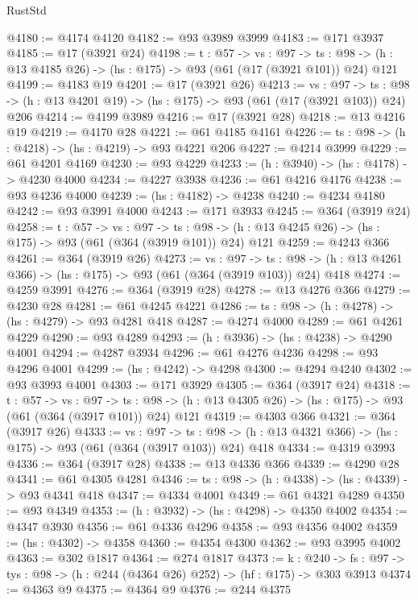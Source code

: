 \begin{lexlean}{RustStd}
\begin{coremodule}
@4180 := @4174 @4120
@4182 := @93 @3989 @3999
@4183 := @171 @3937
@4185 := @17 (@3921 @24)
@4198 := {t : @57} ->
  {vs : @97} ->
  {ts : @98} -> (h : @13 @4185 @26) -> (hs : @175) -> @93 (@61 (@17 (@3921 @101)) @24) @121
@4199 := @4183 @19
@4201 := @17 (@3921 @26)
@4213 := {vs : @97} ->
  {ts : @98} -> (h : @13 @4201 @19) -> (hs : @175) -> @93 (@61 (@17 (@3921 @103)) @24) @206
@4214 := @4199 @3989
@4216 := @17 (@3921 @28)
@4218 := @13 @4216 @19
@4219 := @4170 @28
@4221 := @61 @4185 @4161
@4226 := {ts : @98} -> (h : @4218) -> (hs : @4219) -> @93 @4221 @206
@4227 := @4214 @3999
@4229 := @61 @4201 @4169
@4230 := @93 @4229
@4233 := (h : @3940) -> (hs : @4178) -> @4230 @4000
@4234 := @4227 @3938
@4236 := @61 @4216 @4176
@4238 := @93 @4236 @4000
@4239 := (hs : @4182) -> @4238
@4240 := @4234 @4180
@4242 := @93 @3991 @4000
@4243 := @171 @3933
@4245 := @364 (@3919 @24)
@4258 := {t : @57} ->
  {vs : @97} ->
  {ts : @98} -> (h : @13 @4245 @26) -> (hs : @175) -> @93 (@61 (@364 (@3919 @101)) @24) @121
@4259 := @4243 @366
@4261 := @364 (@3919 @26)
@4273 := {vs : @97} ->
  {ts : @98} -> (h : @13 @4261 @366) -> (hs : @175) -> @93 (@61 (@364 (@3919 @103)) @24) @418
@4274 := @4259 @3991
@4276 := @364 (@3919 @28)
@4278 := @13 @4276 @366
@4279 := @4230 @28
@4281 := @61 @4245 @4221
@4286 := {ts : @98} -> (h : @4278) -> (hs : @4279) -> @93 @4281 @418
@4287 := @4274 @4000
@4289 := @61 @4261 @4229
@4290 := @93 @4289
@4293 := (h : @3936) -> (hs : @4238) -> @4290 @4001
@4294 := @4287 @3934
@4296 := @61 @4276 @4236
@4298 := @93 @4296 @4001
@4299 := (hs : @4242) -> @4298
@4300 := @4294 @4240
@4302 := @93 @3993 @4001
@4303 := @171 @3929
@4305 := @364 (@3917 @24)
@4318 := {t : @57} ->
  {vs : @97} ->
  {ts : @98} -> (h : @13 @4305 @26) -> (hs : @175) -> @93 (@61 (@364 (@3917 @101)) @24) @121
@4319 := @4303 @366
@4321 := @364 (@3917 @26)
@4333 := {vs : @97} ->
  {ts : @98} -> (h : @13 @4321 @366) -> (hs : @175) -> @93 (@61 (@364 (@3917 @103)) @24) @418
@4334 := @4319 @3993
@4336 := @364 (@3917 @28)
@4338 := @13 @4336 @366
@4339 := @4290 @28
@4341 := @61 @4305 @4281
@4346 := {ts : @98} -> (h : @4338) -> (hs : @4339) -> @93 @4341 @418
@4347 := @4334 @4001
@4349 := @61 @4321 @4289
@4350 := @93 @4349
@4353 := (h : @3932) -> (hs : @4298) -> @4350 @4002
@4354 := @4347 @3930
@4356 := @61 @4336 @4296
@4358 := @93 @4356 @4002
@4359 := (hs : @4302) -> @4358
@4360 := @4354 @4300
@4362 := @93 @3995 @4002
@4363 := @302 @1817
@4364 := @274 @1817
@4373 := {k : @240} ->
  {fs : @97} -> {tys : @98} -> (h : @244 (@4364 @26) @252) -> (hf : @175) -> @303 @3913
@4374 := @4363 @9
@4375 := @4364 @9
@4376 := @244 @4375

\end{coremodule}
\end{lexlean}
